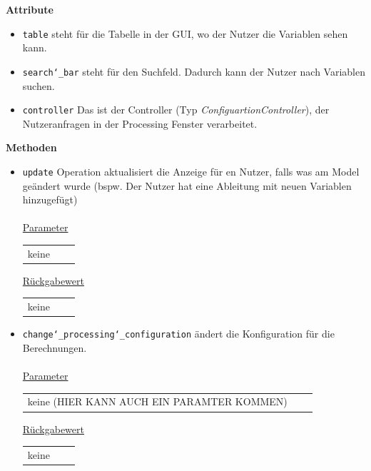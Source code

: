 \documentclass{article}
\begin{document}
\textbf{{Attribute}}
\begin{itemize}
\item \texttt{table} \newline steht für die Tabelle in der GUI, wo der Nutzer die Variablen sehen kann.
\item \texttt{search\char`_bar} \newline steht für den Suchfeld. Dadurch kann der Nutzer nach Variablen suchen.
\item \texttt{controller} \newline Das ist der Controller (Typ \textit{ConfiguartionController}), der Nutzeranfragen in der Processing Fenster verarbeitet.
\end{itemize}

\textbf{{Methoden}}
\begin{itemize}
\item \texttt{update} \newline Operation aktualisiert die Anzeige für en Nutzer, falls was am Model geändert wurde (bspw. Der Nutzer hat eine  Ableitung mit neuen Variablen hinzugefügt)
\\\\
\underline{{Parameter}} 
\begin{tabular}{lll}
keine
\end{tabular}

\underline{{Rückgabewert}}
\begin{tabular}{lll}
keine
\end{tabular}
\item \texttt{change\char`_processing\char`_configuration} \newline ändert die Konfiguration für die Berechnungen.
\\\\
\underline{{Parameter}} 
\begin{tabular}{lll}
keine (HIER KANN AUCH EIN PARAMTER KOMMEN)
\end{tabular}

\underline{{Rückgabewert}}
\begin{tabular}{lll}
keine
\end{tabular}
\end{itemize}
\end{document}
